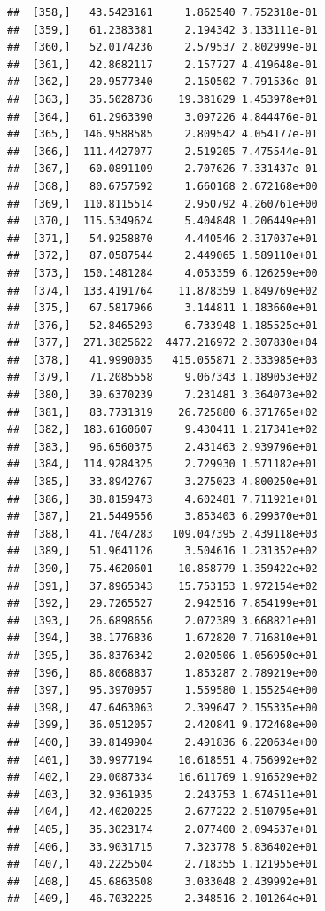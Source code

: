 \documentclass[article]{jss}\usepackage[]{graphicx}\usepackage[]{xcolor}
\makeatletter
\newenvironment{kframe}{%
 \def\at@end@of@kframe{}%
 \ifinner\ifhmode%
  \def\at@end@of@kframe{\end{minipage}}%
  \begin{minipage}{\columnwidth}%
 \fi\fi%
 \def\FrameCommand##1{\hskip\@totalleftmargin \hskip-\fboxsep
 \colorbox{shadecolor}{##1}\hskip-\fboxsep
     \hskip-\linewidth \hskip-\@totalleftmargin \hskip\columnwidth}%
 \MakeFramed {\advance\hsize-\width
   \@totalleftmargin\z@ \linewidth\hsize
   \@setminipage}}%
 {\par\unskip\endMakeFramed%
 \at@end@of@kframe}
\newenvironment{knitrout}{}{} %
\makeatother
\begin{document}
\begin{knitrout}
\begin{kframe}
\begin{verbatim}
##  [358,]   43.5423161     1.862540 7.752318e-01
##  [359,]   61.2383381     2.194342 3.133111e-01
##  [360,]   52.0174236     2.579537 2.802999e-01
##  [361,]   42.8682117     2.157727 4.419648e-01
##  [362,]   20.9577340     2.150502 7.791536e-01
##  [363,]   35.5028736    19.381629 1.453978e+01
##  [364,]   61.2963390     3.097226 4.844476e-01
##  [365,]  146.9588585     2.809542 4.054177e-01
##  [366,]  111.4427077     2.519205 7.475544e-01
##  [367,]   60.0891109     2.707626 7.331437e-01
##  [368,]   80.6757592     1.660168 2.672168e+00
##  [369,]  110.8115514     2.950792 4.260761e+00
##  [370,]  115.5349624     5.404848 1.206449e+01
##  [371,]   54.9258870     4.440546 2.317037e+01
##  [372,]   87.0587544     2.449065 1.589110e+01
##  [373,]  150.1481284     4.053359 6.126259e+00
##  [374,]  133.4191764    11.878359 1.849769e+02
##  [375,]   67.5817966     3.144811 1.183660e+01
##  [376,]   52.8465293     6.733948 1.185525e+01
##  [377,]  271.3825622  4477.216972 2.307830e+04
##  [378,]   41.9990035   415.055871 2.333985e+03
##  [379,]   71.2085558     9.067343 1.189053e+02
##  [380,]   39.6370239     7.231481 3.364073e+02
##  [381,]   83.7731319    26.725880 6.371765e+02
##  [382,]  183.6160607     9.430411 1.217341e+02
##  [383,]   96.6560375     2.431463 2.939796e+01
##  [384,]  114.9284325     2.729930 1.571182e+01
##  [385,]   33.8942767     3.275023 4.800250e+01
##  [386,]   38.8159473     4.602481 7.711921e+01
##  [387,]   21.5449556     3.853403 6.299370e+01
##  [388,]   41.7047283   109.047395 2.439118e+03
##  [389,]   51.9641126     3.504616 1.231352e+02
##  [390,]   75.4620601    10.858779 1.359422e+02
##  [391,]   37.8965343    15.753153 1.972154e+02
##  [392,]   29.7265527     2.942516 7.854199e+01
##  [393,]   26.6898656     2.072389 3.668821e+01
##  [394,]   38.1776836     1.672820 7.716810e+01
##  [395,]   36.8376342     2.020506 1.056950e+01
##  [396,]   86.8068837     1.853287 2.789219e+00
##  [397,]   95.3970957     1.559580 1.155254e+00
##  [398,]   47.6463063     2.399647 2.155335e+00
##  [399,]   36.0512057     2.420841 9.172468e+00
##  [400,]   39.8149904     2.491836 6.220634e+00
##  [401,]   30.9977194    10.618551 4.756992e+02
##  [402,]   29.0087334    16.611769 1.916529e+02
##  [403,]   32.9361935     2.243753 1.674511e+01
##  [404,]   42.4020225     2.677222 2.510795e+01
##  [405,]   35.3023174     2.077400 2.094537e+01
##  [406,]   33.9031715     7.323778 5.836402e+01
##  [407,]   40.2225504     2.718355 1.121955e+01
##  [408,]   45.6863508     3.033048 2.439992e+01
##  [409,]   46.7032225     2.348516 2.101264e+01

\end{verbatim}
\end{kframe}
\end{knitrout}
\end{document}
